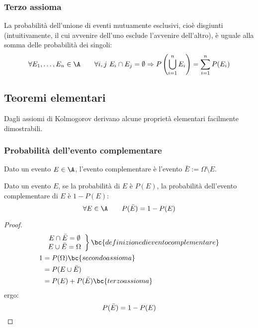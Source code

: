 \subsubsection{Terzo assioma}
La probabilità dell'unione di eventi mutuamente esclusivi, cioè disgiunti (intuitivamente, il cui avvenire dell'uno esclude l'avvenire dell'altro), è uguale alla somma delle probabilità dei singoli:
\begin{equation*}
	\forall E_1,\dots,E_n\in\A\qquad \forall i,j~E_i\cap E_j = \emptyset \Rightarrow P\left( \bigcup_{i=1}^n E_i \right)=\sum_{i=1}^n P(E_i)
\end{equation*}



\subsection{Teoremi elementari}
Dagli assiomi di Kolmogorov derivano alcune proprietà elementari facilmente dimostrabili.


\subsubsection{Probabilità dell'evento complementare}
\begin{defin}
	Dato un evento $E\in\A$, l'evento complementare è l'evento $\bar E := \Omega\setminus E$.
\end{defin}
\begin{teor} \label{t:probcompl}
	Dato un evento $E$, se la probabilità di $E$ è $P(E)$, la probabilità dell'evento complementare di $E$ è $1-P(E)$:
	\begin{equation*}
		\forall E\in\A\qquad P(\bar E)=1-P(E)
	\end{equation*}
\end{teor}
\begin{proof}
	\begin{align*}
		  & \left.
		\begin{array}{cc}
			E\cap\bar E=\emptyset \\
			E\cup\bar E=\Omega
		\end{array} \right\}  \bc{definizione di evento complementare} \\
		1 & = P(\Omega)        \bc{secondo assioma}                                  \\
		  & = P(E\cup\bar E)                                                         \\
		  & = P(E)+P(\bar E)   \bc{terzo assioma}
	\end{align*}
	ergo:
	\begin{equation*}
		P(\bar E)=1-P(E) \qedhere
	\end{equation*}
\end{proof}

